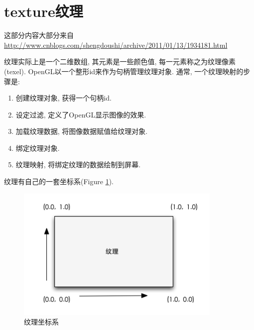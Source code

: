 \section*{\ZHH \Large texture纹理}{
    {这部分内容大部分来自\href{http://www.cnblogs.com/shengdoushi/archive/2011/01/13/1934181.html}{http://www.cnblogs.com/shengdoushi/archive/2011/01/13/1934181.html}}\par
    {纹理实际上是一个二维数组, 其元素是一些颜色值, 每一元素称之为纹理像素(texel). OpenGL以一个整形id来作为句柄管理纹理对象. 通常, 一个纹理映射的步骤是:}
    \begin{enumerate}
    \item{创建纹理对象, 获得一个句柄id.}
    \item{设定过滤, 定义了OpenGL显示图像的效果. }
    \item{加载纹理数据, 将图像数据赋值给纹理对象. }
    \item{绑定纹理对象. }
    \item{纹理映射, 将绑定纹理的数据绘制到屏幕. }
    \end{enumerate}
    \par

    {纹理有自己的一套坐标系(Figure \ref{label_texture_corrd}). }
    \begin{figure}[htbp]
        \centering
        \caption{\label{label_texture_corrd} 纹理坐标系}
        \includegraphics[width=280pt, keepaspectratio]{texture_coord.png}
    \end{figure}
    \par

}
